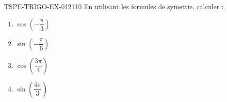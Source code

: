 \begin{exercice}{TSPE-TRIGO-EX-012}{1}{10}
En utilisant les formules de symetrie, calculer :
\begin{enumerate}
  \item $\cos\!\left(-\dfrac{\pi}{3}\right)$
  \item $\sin\!\left(-\dfrac{\pi}{6}\right)$
  \item $\cos\!\left(\dfrac{3\pi}{4}\right)$
  \item $\sin\!\left(\dfrac{4\pi}{3}\right)$
\end{enumerate}
\end{exercice}
